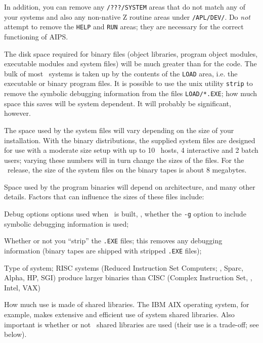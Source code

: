 In addition, you can remove any {\tt \thisver/???/SYSTEM} areas that
do not match any of your systems and also any non-native Z routine
areas under {\tt \thisver/APL/DEV/}.  Do {\it not\/} attempt to remove
the {\tt HELP} and {\tt RUN} areas; they are necessary for the correct
functioning of AIPS.  \medskip


The disk space required for binary files (object libraries, program object
modules, executable modules and system files) will be much greater than
for the code.  The bulk of most \AIPS\ systems is taken up by the contents
of the {\tt \dol LOAD} area, i.e. the executable or binary program files.
It is possible to use the unix utility {\tt strip} to remove the symbolic
debugging information from the files {\tt \dol LOAD/*.EXE}; how much space
this saves will be system dependent.  It will probably be significant,
however.

The space used by the system files will vary depending on the size of your
installation.  With the binary distributions, the supplied system files
are designed for use with a moderate size setup with up to 10
\AIPS\ hosts, 4 interactive and 2 batch users; varying these numbers will
in turn change the sizes of the files.  For the \thisver\ release, the
size of the system files on the binary tapes is about 8 megabytes.

Space used by the program binaries will depend on architecture, and many
other details.  Factors that can influence the sizes of these files
include:\medskip

\item\bul Debug options options used when \AIPS\ is built, \eg,
        whether the {\tt -g} option to include symbolic debugging
        information is used;
\item\bul Whether or not you ``strip'' the {\tt *.EXE} files; this
        removes any debugging information (binary tapes are shipped with
        stripped {\tt .EXE} files);
\item\bul Type of system; RISC systems (Reduced Instruction Set
        Computers; \eg, Sparc, Alpha, HP, SGI) produce larger binaries
        than CISC (Complex Instruction Set, \eg, Intel, VAX)
\item\bul How much use is made of shared libraries.  The IBM AIX
        operating system, for example, makes extensive and efficient use
        of system shared libraries.  Also important is whether or not
        \AIPS\ shared libraries are used (their use is a trade-off; see
        below).

